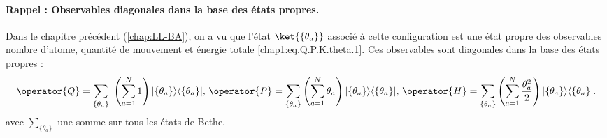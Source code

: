 \begin{mdframed}[
	linewidth=0.5pt, 
	backgroundcolor=gray!5, 
	roundcorner=50pt,	
	innerleftmargin=5pt,
    innerrightmargin=5pt,
    innertopmargin=-10pt,
    innerbottommargin=2pt,
    leftmargin=2pt,
    rightmargin=2pt
	]
\paragraph{Rappel : Observables diagonales dans la base des états propres.}
Dans le chapitre précédent (\ref{chap:LL-BA}), on a vu que l'état $\ket{\{ \theta_a \}}$ associé à cette configuration est une état propre des observables nombre d'atome, quantité de mouvement  et  énergie totale \eqref{chap1:eq.Q.P.K.theta.1}. Ces observables sont diagonales dans la base des états propres :
\begin{eqnarray}
	\operator{Q}  =  \sum_{ \{\theta_a\} } \left ( \sum_{a = 1}^{N}  1 \right )  \vert \{ \theta_a\}\rangle	\langle \{ \theta_a \}\vert, \, 
	\operator{P}  =  \sum_{\{ \theta_a\}}\left( \sum_{a = 1}^{N}  \theta_a \right )   \vert \{ \theta_a\}\rangle	\langle \{ \theta_a \}\vert,\,\operator{H}  =  \sum_{\{ \theta_a\}}\left ( \sum_{a = 1}^{N} \frac{\theta_a^2}{2} \right )   \vert \{ \theta_a\}\rangle	\langle \{ \theta_a \}\vert.\label{chap.2.gge.1}		
\end{eqnarray}
avec $ \sum_{\{ \theta_a\}}$ une somme sur tous les états de Bethe.\\

\end{mdframed}  


